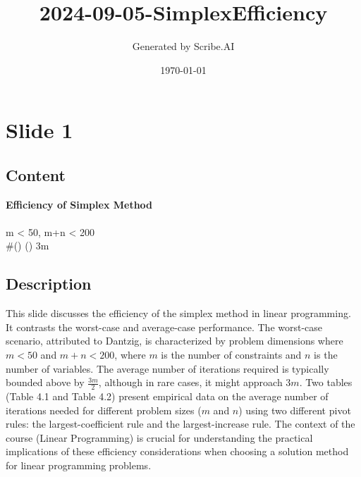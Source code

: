 \documentclass{article}%
\title{2024{-}09{-}05{-}SimplexEfficiency}%
\author{Generated by Scribe.AI}%
\date{\today}%
\begin{document}
%
\normalsize%
\maketitle%
\section{Slide 1}%
\label{sec:Slide1}%
\subsection{Content}%

\textbf{Efficiency of Simplex Method} \\
\textbullet \quad {} \\
\textbullet \quad {} \quad m < 50, \quad m+n < 200 \\
\quad \#() \le {} \quad () \quad {} \approx 3m
%
\subsection{Description}%
This slide discusses the efficiency of the simplex method in linear programming.  It contrasts the worst-case and average-case performance.  The worst-case scenario, attributed to Dantzig, is characterized by problem dimensions where $m < 50$ and $m + n < 200$, where $m$ is the number of constraints and $n$ is the number of variables.  The average number of iterations required is typically bounded above by $\frac{3m}{2}$, although in rare cases, it might approach $3m$.  Two tables (Table 4.1 and Table 4.2) present empirical data on the average number of iterations needed for different problem sizes ($m$ and $n$) using two different pivot rules: the largest-coefficient rule and the largest-increase rule. The context of the course (Linear Programming) is crucial for understanding the practical implications of these efficiency considerations when choosing a solution method for linear programming problems.%
\end{document}
